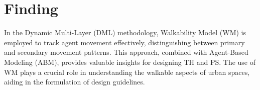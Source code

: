 \section*{%
  Finding
 }
In the Dynamic Multi-Layer (DML) methodology, Walkability Model (WM) is employed to track agent movement effectively, distinguishing between primary and secondary movement patterns. This approach, combined with Agent-Based Modeling (ABM), provides valuable insights for designing TH and PS. The use of WM plays a crucial role in understanding the walkable aspects of urban spaces, aiding in the formulation of design guidelines.
\EndTwoColumnLayout
\newpage
